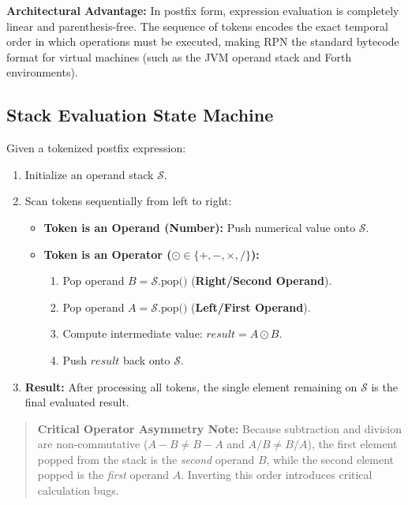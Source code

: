 \documentclass[10pt,journal,compsoc,onecolumn]{IEEEtran}
\begin{document}
\textbf{Architectural Advantage:} In postfix form, expression evaluation is completely linear and parenthesis-free. The sequence of tokens encodes the exact temporal order in which operations must be executed, making RPN the standard bytecode format for virtual machines (such as the JVM operand stack and Forth environments).

\subsection{Stack Evaluation State Machine}

Given a tokenized postfix expression:
\begin{enumerate}
    \item Initialize an operand stack $\mathcal{S}$.
    \item Scan tokens sequentially from left to right:
    \begin{itemize}
        \item \textbf{Token is an Operand (Number):} Push numerical value onto $\mathcal{S}$.
        \item \textbf{Token is an Operator ($\odot \in \{+, -, \times, /\}$):}
        \begin{enumerate}
            \item Pop operand $B = \mathcal{S}\text{.pop()}$ (\textbf{Right/Second Operand}).
            \item Pop operand $A = \mathcal{S}\text{.pop()}$ (\textbf{Left/First Operand}).
            \item Compute intermediate value: $result = A \odot B$.
            \item Push $result$ back onto $\mathcal{S}$.
        \end{enumerate}
    \end{itemize}
    \item \textbf{Result:} After processing all tokens, the single element remaining on $\mathcal{S}$ is the final evaluated result.
\end{enumerate}

\begin{quote}
\textbf{Critical Operator Asymmetry Note:} Because subtraction and division are non-commutative ($A - B \ne B - A$ and $A / B \ne B / A$), the first element popped from the stack is the \emph{second} operand $B$, while the second element popped is the \emph{first} operand $A$. Inverting this order introduces critical calculation bugs.
\end{quote}
\end{document}
